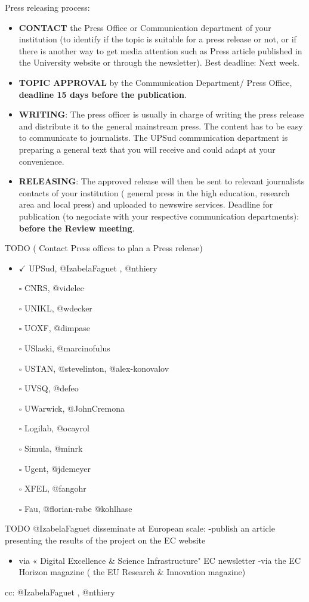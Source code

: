 Press releasing process:

\begin{itemize}
\item
  \textbf{CONTACT} the Press Office or Communication department of your
  institution (to identify if the topic is suitable for a press release
  or not, or if there is another way to get media attention such as
  Press article published in the University website or through the
  newsletter). Best deadline: Next week.
\item
  \textbf{TOPIC APPROVAL} by the Communication Department/ Press Office,
  \textbf{deadline 15 days before the publication}.
\item
  \textbf{WRITING}: The press officer is usually in charge of writing
  the press release and distribute it to the general mainstream press.
  The content has to be easy to communicate to journalists. The UPSud
  communication department is preparing a general text that you will
  receive and could adapt at your convenience.
\item
  \textbf{RELEASING}: The approved release will then be sent to relevant
  journalists contacts of your institution ( general press in the high
  education, research area and local press) and uploaded to newswire
  services. Deadline for publication (to negociate with your respective
  communication departments): \textbf{before the Review meeting}.
\end{itemize}

TODO ( Contact Press offices to plan a Press release)

\begin{itemize}
\tightlist
\item
  \(\checkmark\) UPSud, @IzabelaFaguet , @nthiery
\item[$\square$]
  CNRS, @videlec
\item[$\square$]
  UNIKL, @wdecker
\item[$\square$]
  UOXF, @dimpase
\item[$\square$]
  USlaski, @marcinofulus
\item[$\square$]
  USTAN, @stevelinton, @alex-konovalov
\item[$\square$]
  UVSQ, @defeo
\item[$\square$]
  UWarwick, @JohnCremona
\item[$\square$]
  Logilab, @ocayrol
\item[$\square$]
  Simula, @minrk
\item[$\square$]
  Ugent, @jdemeyer
\item[$\square$]
  XFEL, @fangohr
\item[$\square$]
  Fau, @florian-rabe @kohlhase
\end{itemize}

TODO @IzabelaFaguet disseminate at European scale: -publish an article
presenting the results of the project on the EC website

\begin{itemize}
\tightlist
\item
  via « Digital Excellence \& Science Infrastructure" EC newsletter -via
  the EC Horizon magazine ( the EU Research \& Innovation magazine)
\end{itemize}

cc: @IzabelaFaguet , @nthiery
